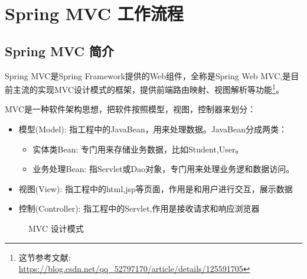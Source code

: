 \section{Spring MVC 工作流程}

\subsection{Spring MVC 简介}

Spring MVC是Spring Framework提供的Web组件，全称是Spring Web MVC,是目前主流的实现MVC设计模式的框架，提供前端路由映射、视图解析等功能\footnote{这节参考文献: \url{https://blog.csdn.net/qq_52797170/article/details/125591705}}。

MVC是一种软件架构思想，把软件按照模型，视图，控制器来划分：
\begin{itemize}
    \item 模型(Model): 指工程中的JavaBean，用来处理数据。JavaBean分成两类：
    \begin{itemize}
        \item 实体类Bean: 专门用来存储业务数据，比如Student,User。
        \item 业务处理Bean: 指Servlet或Dao对象，专门用来处理业务逻和数据访问。
    \end{itemize}
    \item 视图(View): 指工程中的html,jsp等页面，作用是和用户进行交互，展示数据
    \item 控制(Controller): 指工程中的Servlet,作用是接收请求和响应浏览器
\end{itemize}

\begin{figure}[H]
    \small
    \centering
    \caption{MVC 设计模式}
    \label{fig:MVC 设计模式}
\end{figure}

